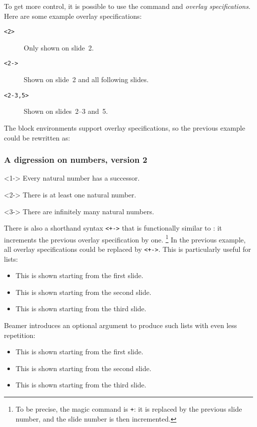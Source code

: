 To get more control, it is possible to use the  command
and \emph{overlay specifications}.
Here are some example overlay specifications:
\begin{description}
\item[\texttt{<2>}] Only shown on slide~2.
\item[\texttt{<2->}] Shown on slide~2 and all following slides.
\item[\texttt{<2-3,5>}] Shown on slides~2--3 and~5.
\end{description}
%
The block environments support overlay specifications,
so the previous example could be rewritten as:
%
\begin{ExampleCode}
\begin{frame}
\frametitle{A digression on numbers, version 2}

\begin{theorem}<1->
Every natural number has a successor.
\end{theorem}

\begin{theorem}<2->
There is at least one natural number.
\end{theorem}

\begin{corollary}<3->
There are infinitely many natural numbers.
\end{corollary}
\end{frame}
\end{ExampleCode}
%
There is also a shorthand syntax \verb|<+->| that is functionally similar to :
it increments the previous overlay specification by one.%
\footnote{To be precise, the magic command is \texttt{+}:
it is replaced by the previous slide number, and the slide number is then incremented.}
In the previous example, all overlay specifications could be replaced by \verb|<+->|.
This is particularly useful for lists:
%
\begin{ExampleCode}
\begin{itemize}
    \item<+-> This is shown starting from the first slide.
    \item<+-> This is shown starting from the second slide.
    \item<+-> This is shown starting from the third slide.
\end{itemize}
\end{ExampleCode}
%
Beamer introduces an optional argument to produce such lists with even less repetition:
%
\begin{ExampleCode}
\begin{itemize}[<+->]
    \item This is shown starting from the first slide.
    \item This is shown starting from the second slide.
    \item This is shown starting from the third slide.
\end{itemize}
\end{ExampleCode}


